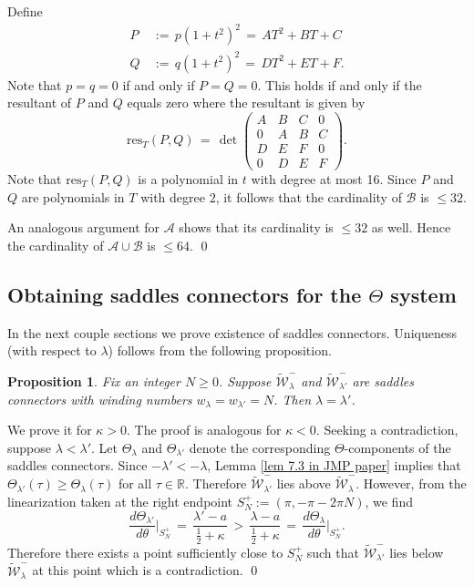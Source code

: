\documentclass[11 pt]{article}
\newtheorem{prop}[thm]{Proposition}%
\renewcommand\l{\lambda}
\renewcommand\({\left(}
\renewcommand\){\right)}
\newcommand\wt{\widetilde}
\newcommand\<{\langle}
\renewcommand\>{\rangle}
\renewcommand\l{\lambda}
\newcommand\8{\infty}
\newcommand{\R}{\mathbb R}
\newcommand{\mc}{\mathcal}
\begin{document}
Define 
\begin{align*}
P \,&:=\, p(1+t^2)^2 \,=\, AT^2 + BT + C
\\
Q\,&:=\, q(1+t^2)^2 \,=\, D T^2 + E T + F.
\end{align*} 
Note that $p = q = 0$ if and only if $P = Q =0$. This holds if and only if the resultant of $P$ and $Q$ equals zero where the resultant is given by
\[
\text{res}_T(P,Q) \,=\, \det \begin{pmatrix}
A & B & C & 0
\\
0 & A & B & C
\\
D & E & F & 0
\\
 0 & D & E & F
\end{pmatrix}.
\]
Note that $\text{res}_T(P,Q)$ is a polynomial in $t$ with degree at most 16. Since $P$ and $Q$ are polynomials in $T$ with degree $2$, it follows that the cardinality of $\mc{B}$ is $\leq 32$. 

An analogous argument for $\mc{A}$ shows that its cardinality is $\leq 32$ as well. Hence the cardinality of $\mc{A} \cup \mc{B}$ is $\leq 64$.
\qed


\subsection{Obtaining saddles connectors for the $\Theta$ system}

\medskip

In the next couple sections we prove existence of saddles connectors. Uniqueness (with respect to $\l$) follows from the following proposition.


\medskip
\medskip

\begin{prop}\label{unique theta prop}
Fix an integer $N \geq 0$. Suppose $\wt{\mc{W}}_\l^-$ and $\wt{\mc{W}}_{\l'}^-$ are saddles connectors with winding numbers $w_\l = w_{\l'} = N$. Then $\l = \l'$. 
\end{prop}


\proof
We prove it for $\kappa > 0$. The proof is analogous for $\kappa < 0$. Seeking a contradiction, suppose $\l < \l'$. Let $\Theta_{\l}$ and $\Theta_{\l'}$ denote the corresponding $\Theta$-components of the saddles connectors. Since $-\l' < -\l$, Lemma \ref{lem 7.3 in JMP paper} implies that $\Theta_{\l'}(\tau) \geq \Theta_{\l}(\tau)$ for all $\tau \in \R$.  Therefore $\wt{\mc{W}}^-_{\l'}$ lies above $\wt{\mc{W}}^-_{\l}$. However, from the linearization taken at the right endpoint $S^+_N := (\pi, -\pi -2\pi N)$, we find
\[
\frac{d\Theta_{\l'}}{d\theta}\bigg|_{S^+_N} \,=\, \frac{\l' -a}{\frac{1}{2} + \kappa} \,>\, \frac{\l-a}{\frac{1}{2} + \kappa} \,=\, \frac{d\Theta_{\l}}{d\theta}\bigg|_{S^+_N}.
\]
Therefore there exists a point sufficiently close to $S^+_N$ such that $\wt{\mc{W}}^-_{\l'}$ lies below $\wt{\mc{W}}^-_{\l}$ at this point which is a contradiction.
\qed
\end{document}
